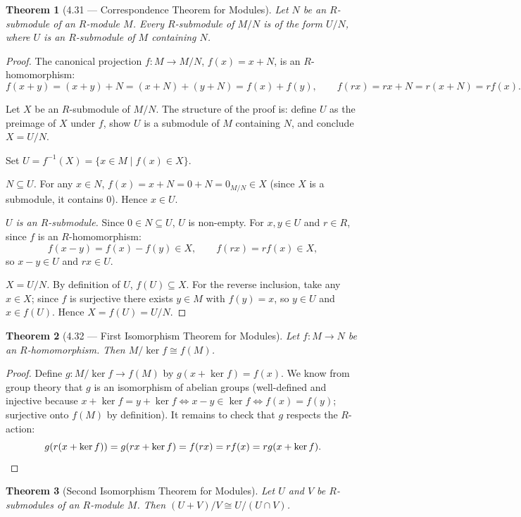 \documentclass[12pt]{article}
\newtheorem{theorem}{Theorem}
\begin{document}
\begin{theorem}[4.31 — Correspondence Theorem for Modules]
Let $N$ be an $R$-submodule of an $R$-module $M$. Every $R$-submodule of $M/N$ is of the form $U/N$, where $U$ is an $R$-submodule of $M$ containing $N$.
\end{theorem}

\begin{proof}
The canonical projection $f : M \to M/N$, $f(x) = x + N$, is an $R$-homomorphism:
\[
  f(x + y) = (x+y) + N = (x+N) + (y+N) = f(x) + f(y), \qquad f(rx) = rx + N = r(x+N) = rf(x).
\]

Let $X$ be an $R$-submodule of $M/N$. The structure of the proof is: define $U$ as the preimage of $X$ under $f$, show $U$ is a submodule of $M$ containing $N$, and conclude $X = U/N$.

Set $U = f^{-1}(X) = \{x \in M \mid f(x) \in X\}$.

\textit{$N \subseteq U$.} For any $x \in N$, $f(x) = x + N = 0 + N = 0_{M/N} \in X$ (since $X$ is a submodule, it contains $0$). Hence $x \in U$.

\textit{$U$ is an $R$-submodule.} Since $0 \in N \subseteq U$, $U$ is non-empty. For $x, y \in U$ and $r \in R$, since $f$ is an $R$-homomorphism:
\[
  f(x - y) = f(x) - f(y) \in X, \qquad f(rx) = rf(x) \in X,
\]
so $x - y \in U$ and $rx \in U$.

\textit{$X = U/N$.} By definition of $U$, $f(U) \subseteq X$. For the reverse inclusion, take any $x \in X$; since $f$ is surjective there exists $y \in M$ with $f(y) = x$, so $y \in U$ and $x \in f(U)$. Hence $X = f(U) = U/N$.
\end{proof}


\begin{theorem}[4.32 — First Isomorphism Theorem for Modules]
Let $f : M \to N$ be an $R$-homomorphism. Then $M/\ker f \cong f(M)$.
\end{theorem}

\begin{proof}
Define $g : M/\ker f \to f(M)$ by $g(x + \ker f) = f(x)$. We know from group theory that $g$ is an isomorphism of abelian groups (well-defined and injective because $x + \ker f = y + \ker f \iff x - y \in \ker f \iff f(x) = f(y)$; surjective onto $f(M)$ by definition). It remains to check that $g$ respects the $R$-action:
\[
  g(r(x + \ker f)) = g(rx + \ker f) = f(rx) = rf(x) = rg(x + \ker f). \qedhere
\]
\end{proof}

\begin{theorem}[Second Isomorphism Theorem for Modules]
Let $U$ and $V$ be $R$-submodules of an $R$-module $M$. Then $(U+V)/V \cong U/(U \cap V)$.
\end{theorem}
\end{document}
